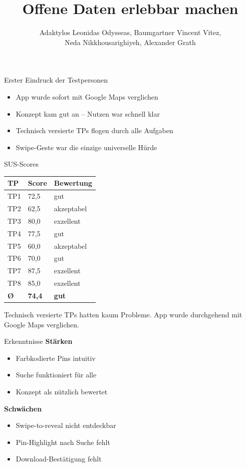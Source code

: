 \documentclass{beamer}
\title{Offene Daten erlebbar machen}
\date{}
\author{Adaktylos Leonidas Odysseas, Baumgartner Vincent Vitez,\\ Neda Nikkhousarighiyeh, Alexander Grath}
\begin{document}

  \begin{frame}{Erster Eindruck der Testpersonen}
    \begin{itemize}
      \setlength\itemsep{0.8em}
      \item App wurde sofort mit Google Maps verglichen
      \item Konzept kam gut an – Nutzen war schnell klar
      \item Technisch versierte TPs flogen durch alle Aufgaben
      \item Swipe-Geste war die einzige universelle Hürde
    \end{itemize}
  \end{frame}

   \begin{frame}{SUS-Scores}
    \centering
    \begin{tabular}{@{}lll@{}}
      \textbf{TP} & \textbf{Score} & \textbf{Bewertung} \\
      \hline
      TP1 & 72{,}5 & gut \\
      TP2 & 62{,}5 & akzeptabel \\
      TP3 & 80{,}0 & exzellent \\
      TP4 & 77{,}5 & gut \\
      TP5 & 60{,}0 & akzeptabel \\
      TP6 & 70{,}0 & gut \\
      TP7 & 87{,}5 & exzellent \\
      TP8 & 85{,}0 & exzellent \\
      \hline
      \textbf{Ø} & \textbf{74{,}4} & \textbf{gut} \\
    \end{tabular}

    \vspace{0.4cm}
    \small Technisch versierte TPs hatten kaum Probleme. App wurde durchgehend mit Google Maps verglichen.
  \end{frame}

  \begin{frame}{Erkenntnisse}
    \textbf{Stärken}
    \begin{itemize}
      \item Farbkodierte Pins intuitiv
      \item Suche funktioniert für alle
      \item Konzept als nützlich bewertet
    \end{itemize}

    \vspace{0.4cm}
    \textbf{Schwächen}
    \begin{itemize}
      \item Swipe-to-reveal nicht entdeckbar
      \item Pin-Highlight nach Suche fehlt
      \item Download-Bestätigung fehlt
    \end{itemize}
  \end{frame}
\end{document}
